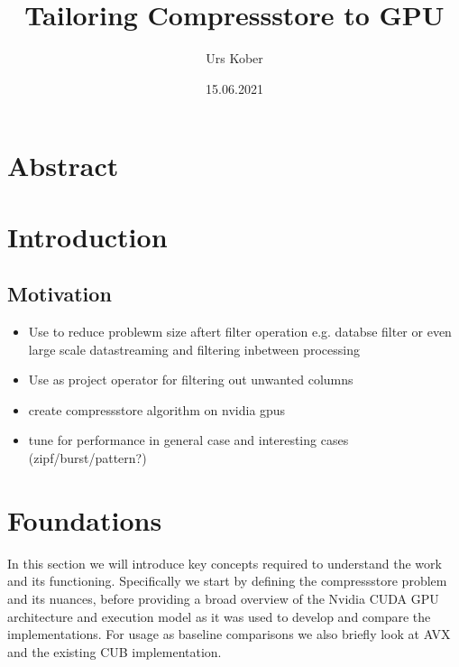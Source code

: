 \documentclass{tudscrreprt}
\begin{document}
	
	\date{15.06.2021}
	\title{Tailoring Compressstore to GPU}
	 
	\author{ Urs Kober
		\matriculationnumber{---}
		\placeofbirth{---}
	}
	\maketitle
	
	\chapter*{Abstract}
	
	\tableofcontents
	
	\chapter{Introduction}
		
		\section{Motivation}
		
			\begin{itemize}
				\item Use to reduce problewm size aftert filter operation
					\subitem e.g. databse filter
					\subitem or even large scale datastreaming and filtering inbetween processing
				\item Use as project operator for filtering out unwanted columns
				\item create compressstore algorithm on nvidia gpus
				\item tune for performance in general case and interesting cases (zipf/burst/pattern?)
			\end{itemize}
		
	\chapter{Foundations}
		In this section we will introduce key concepts required to understand the work and its functioning. Specifically we start by defining the compressstore problem and its nuances, before providing a broad overview of the Nvidia CUDA GPU architecture and execution model as it was used to develop and compare the implementations. For usage as baseline comparisons we also briefly look at AVX and the existing CUB implementation.
	
\end{document}
